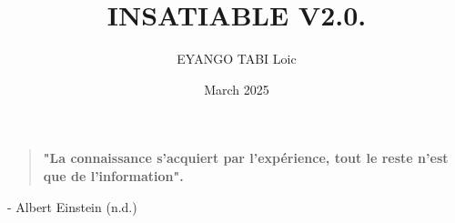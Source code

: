\documentclass[a4paper,12pt,twoside,english]{book}
\title{INSATIABLE V2.0.}
\author{EYANGO TABI Loic}
\date{March 2025}
\begin{document}
    \begin{titlepage}
        \newpage %
        \thispagestyle{empty} %
    \end{titlepage}
    
\renewcommand{\chaptermark}[1]{\markboth{#1}{}}
\frontmatter %

 

\clearpage
\vspace*{0.2\textheight}


\begin{quote}
\textbf{
"La connaissance s'acquiert par l'expérience, tout le reste n'est que de l'information".
}
\end{quote} \bigbreak

\hfill 
- Albert Einstein (n.d.)








\setcounter{secnumdepth}{3} %
\setcounter{tocdepth}{3}
\tableofcontents %
\listoffigures %
\end{document}
